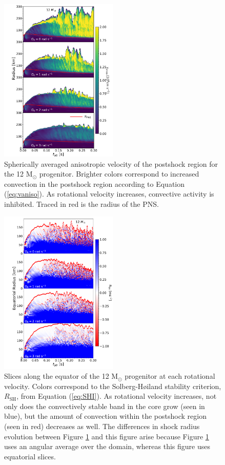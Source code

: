 \documentclass[twocolumn,times]{aastex62}  %
\newcommand{\Msun}{\ensuremath{\mathrm{M}_\odot}\xspace}
\begin{document}
\begin{figure}[]
    \centering
    \includegraphics[width=0.5\textwidth]{vaniso_rad.pdf}
    \caption{Spherically averaged anisotropic velocity of the postshock region for the 12 \Msun progenitor.  Brighter colors correspond to increased convection in the postshock region according to Equation (\ref{eq:vaniso}).  As rotational velocity increases, convective activity is inhibited.  Traced in red is the radius of the PNS.}
    \label{fig:vaniso}
\end{figure}

\begin{figure}[]
    \centering
    \includegraphics[width=0.5\textwidth]{SHI_panel_invert.pdf}
    \caption{Slices along the equator of the 12 \Msun progenitor at each rotational velocity.  Colors correspond to the Solberg-H{\o}iland stability criterion, $R_{\mathrm{SH}}$, from Equation (\ref{eq:SHI}).  As rotational velocity increases, not only does the convectively stable band in the core grow (seen in blue), but the amount of convection within the postshock region (seen in red) decreases as well.  The differences in shock radius evolution between Figure \ref{fig:vaniso} and this figure arise because Figure \ref{fig:vaniso} uses an angular average over the domain, whereas this figure uses equatorial slices.}
    \label{fig:SHI}
\end{figure}
\end{document}

